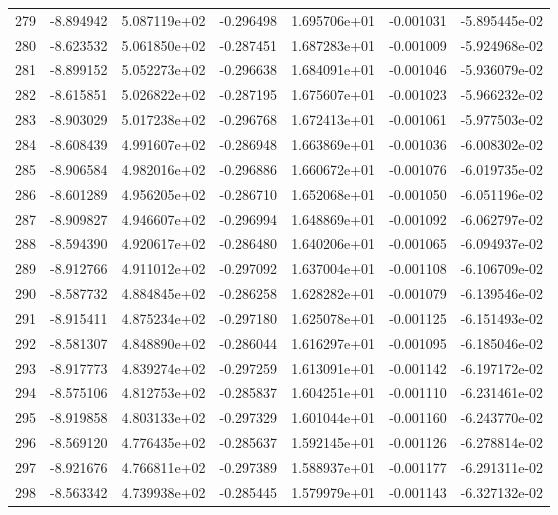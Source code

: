 \begin{tabular}{rrrrrrr}
 279 &  -8.894942 &  5.087119e+02 & -0.296498 &  1.695706e+01 &   -0.001031 & -5.895445e-02 \\
 280 &  -8.623532 &  5.061850e+02 & -0.287451 &  1.687283e+01 &   -0.001009 & -5.924968e-02 \\
 281 &  -8.899152 &  5.052273e+02 & -0.296638 &  1.684091e+01 &   -0.001046 & -5.936079e-02 \\
 282 &  -8.615851 &  5.026822e+02 & -0.287195 &  1.675607e+01 &   -0.001023 & -5.966232e-02 \\
 283 &  -8.903029 &  5.017238e+02 & -0.296768 &  1.672413e+01 &   -0.001061 & -5.977503e-02 \\
 284 &  -8.608439 &  4.991607e+02 & -0.286948 &  1.663869e+01 &   -0.001036 & -6.008302e-02 \\
 285 &  -8.906584 &  4.982016e+02 & -0.296886 &  1.660672e+01 &   -0.001076 & -6.019735e-02 \\
 286 &  -8.601289 &  4.956205e+02 & -0.286710 &  1.652068e+01 &   -0.001050 & -6.051196e-02 \\
 287 &  -8.909827 &  4.946607e+02 & -0.296994 &  1.648869e+01 &   -0.001092 & -6.062797e-02 \\
 288 &  -8.594390 &  4.920617e+02 & -0.286480 &  1.640206e+01 &   -0.001065 & -6.094937e-02 \\
 289 &  -8.912766 &  4.911012e+02 & -0.297092 &  1.637004e+01 &   -0.001108 & -6.106709e-02 \\
 290 &  -8.587732 &  4.884845e+02 & -0.286258 &  1.628282e+01 &   -0.001079 & -6.139546e-02 \\
 291 &  -8.915411 &  4.875234e+02 & -0.297180 &  1.625078e+01 &   -0.001125 & -6.151493e-02 \\
 292 &  -8.581307 &  4.848890e+02 & -0.286044 &  1.616297e+01 &   -0.001095 & -6.185046e-02 \\
 293 &  -8.917773 &  4.839274e+02 & -0.297259 &  1.613091e+01 &   -0.001142 & -6.197172e-02 \\
 294 &  -8.575106 &  4.812753e+02 & -0.285837 &  1.604251e+01 &   -0.001110 & -6.231461e-02 \\
 295 &  -8.919858 &  4.803133e+02 & -0.297329 &  1.601044e+01 &   -0.001160 & -6.243770e-02 \\
 296 &  -8.569120 &  4.776435e+02 & -0.285637 &  1.592145e+01 &   -0.001126 & -6.278814e-02 \\
 297 &  -8.921676 &  4.766811e+02 & -0.297389 &  1.588937e+01 &   -0.001177 & -6.291311e-02 \\
 298 &  -8.563342 &  4.739938e+02 & -0.285445 &  1.579979e+01 &   -0.001143 & -6.327132e-02 \\

\end{tabular}
